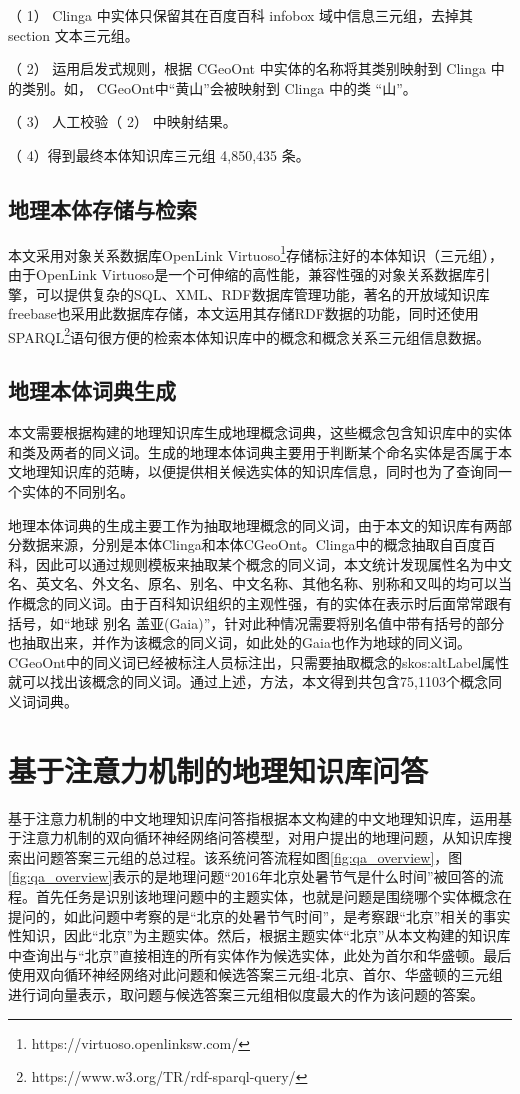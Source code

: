 （ 1） Clinga 中实体只保留其在百度百科 infobox 域中信息三元组，去掉其 section 文本三元组。

（ 2） 运用启发式规则，根据 CGeoOnt 中实体的名称将其类别映射到 Clinga 中的类别。如， CGeoOnt中“黄山”会被映射到 Clinga 中的类 “山”。

（ 3） 人工校验（ 2） 中映射结果。

（ 4）得到最终本体知识库三元组 4,850,435 条。

\subsection{地理本体存储与检索}

本文采用对象关系数据库OpenLink Virtuoso\footnote{https://virtuoso.openlinksw.com/}存储标注好的本体知识（三元组），由于OpenLink Virtuoso是一个可伸缩的高性能，兼容性强的对象关系数据库引擎，可以提供复杂的SQL、XML、RDF数据库管理功能，著名的开放域知识库freebase也采用此数据库存储，本文运用其存储RDF数据的功能，同时还使用SPARQL\footnote{https://www.w3.org/TR/rdf-sparql-query/}语句很方便的检索本体知识库中的概念和概念关系三元组信息数据。

\subsection{地理本体词典生成}
本文需要根据构建的地理知识库生成地理概念词典，这些概念包含知识库中的实体和类及两者的同义词。生成的地理本体词典主要用于判断某个命名实体是否属于本文地理知识库的范畴，以便提供相关候选实体的知识库信息，同时也为了查询同一个实体的不同别名。

地理本体词典的生成主要工作为抽取地理概念的同义词，由于本文的知识库有两部分数据来源，分别是本体Clinga和本体CGeoOnt。Clinga中的概念抽取自百度百科，因此可以通过规则模板来抽取某个概念的同义词，本文统计发现属性名为中文名、英文名、外文名、原名、别名、中文名称、其他名称、别称和又叫的均可以当作概念的同义词。由于百科知识组织的主观性强，有的实体在表示时后面常常跟有括号，如“地球 别名 盖亚(Gaia)”，针对此种情况需要将别名值中带有括号的部分也抽取出来，并作为该概念的同义词，如此处的Gaia也作为地球的同义词。CGeoOnt中的同义词已经被标注人员标注出，只需要抽取概念的skos:altLabel属性就可以找出该概念的同义词。通过上述，方法，本文得到共包含75,1103个概念同义词词典。

\section{基于注意力机制的地理知识库问答}
基于注意力机制的中文地理知识库问答指根据本文构建的中文地理知识库，运用基于注意力机制的双向循环神经网络问答模型，对用户提出的地理问题，从知识库搜索出问题答案三元组的总过程。该系统问答流程如图\ref{fig:qa_overview}，图\ref{fig:qa_overview}表示的是地理问题“2016年北京处暑节气是什么时间”被回答的流程。首先任务是识别该地理问题中的主题实体，也就是问题是围绕哪个实体概念在提问的，如此问题中考察的是“北京的处暑节气时间”，是考察跟“北京”相关的事实性知识，因此“北京”为主题实体。然后，根据主题实体“北京”从本文构建的知识库中查询出与“北京”直接相连的所有实体作为候选实体，此处为首尔和华盛顿。最后使用双向循环神经网络对此问题和候选答案三元组-北京、首尔、华盛顿的三元组进行词向量表示，取问题与候选答案三元组相似度最大的作为该问题的答案。

